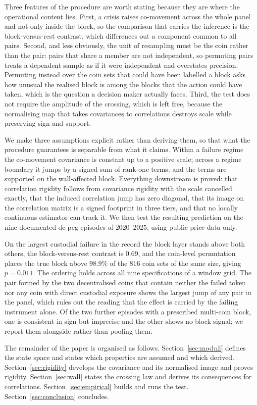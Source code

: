 Three features of the procedure are worth stating because they are where the operational content lies. First, a crisis raises co-movement across the whole panel and not only inside the block, so the comparison that carries the inference is the block-versus-rest contrast, which differences out a component common to all pairs. Second, and less obviously, the unit of resampling must be the coin rather than the pair: pairs that share a member are not independent, so permuting pairs treats a dependent sample as if it were independent and overstates precision. Permuting instead over the coin sets that could have been labelled a block asks how unusual the realised block is among the blocks that the action could have taken, which is the question a decision maker actually faces. Third, the test does not require the amplitude of the crossing, which is left free, because the normalising map that takes covariances to correlations destroys scale while preserving sign and support.

We make three assumptions explicit rather than deriving them, so that what the procedure guarantees is separable from what it claims. Within a failure regime the co-movement covariance is constant up to a positive scale; across a regime boundary it jumps by a signed sum of rank-one terms; and the terms are supported on the wall-affected block. Everything downstream is proved: that correlation rigidity follows from covariance rigidity with the scale cancelled exactly, that the induced correlation jump has zero diagonal, that its image on the correlation matrix is a signed footprint in three tiers, and that no locally continuous estimator can track it. We then test the resulting prediction on the nine documented de-peg episodes of 2020--2025, using public price data only.

On the largest custodial failure in the record the block layer stands above both others, the block-versus-rest contrast is 0.69, and the coin-level permutation places the true block above 98.9\% of the 816 coin sets of the same size, giving $p=0.011$. The ordering holds across all nine specifications of a window grid. The pair formed by the two decentralised coins that contain neither the failed token nor any coin with direct custodial exposure shows the largest jump of any pair in the panel, which rules out the reading that the effect is carried by the failing instrument alone. Of the two further episodes with a prescribed multi-coin block, one is consistent in sign but imprecise and the other shows no block signal; we report them alongside rather than pooling them.

The remainder of the paper is organised as follows. Section~\ref{sec:moduli} defines the state space and states which properties are assumed and which derived. Section~\ref{sec:rigidity} develops the covariance and its normalised image and proves rigidity. Section~\ref{sec:wall} states the crossing law and derives its consequences for correlations. Section~\ref{sec:empirical} builds and runs the test. Section~\ref{sec:conclusion} concludes.
